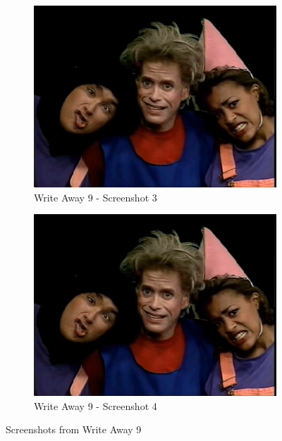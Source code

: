 \begin{figure}[H]
    \begin{subfigure}{0.45\textwidth}
        \centering
        \includegraphics[width=\linewidth]{Games/WriteAway/Images/WriteAway9Screenshot1.png}
        \caption{Write Away 9 - Screenshot 3}
    \end{subfigure}
    \begin{subfigure}{0.45\textwidth}
        \centering
        \includegraphics[width=\linewidth]{Games/WriteAway/Images/WriteAway9Screenshot1.png}
        \caption{Write Away 9 - Screenshot 4}
    \end{subfigure}
    \caption{Screenshots from Write Away 9}
\end{figure}
